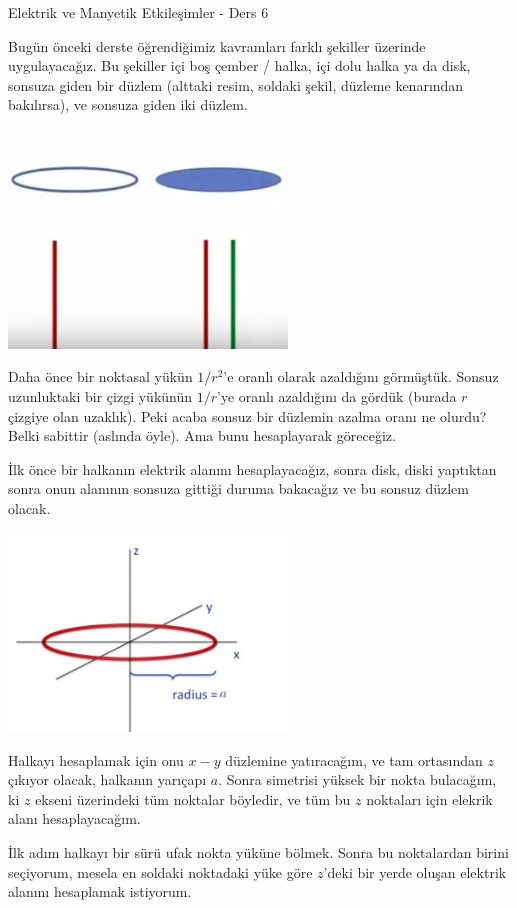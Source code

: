 \documentclass[12pt,fleqn]{article}\usepackage{../../common}
\begin{document}
Elektrik ve Manyetik Etkileşimler - Ders 6

Bugün önceki derste öğrendiğimiz kavramları farklı şekiller üzerinde
uygulayacağız. Bu şekiller içi boş çember / halka, içi dolu halka ya da
disk, sonsuza giden bir düzlem (alttaki resim, soldaki şekil, düzleme
kenarından bakılırsa), ve sonsuza giden iki düzlem.

\includegraphics[width=20em]{06_01.png}

Daha önce bir noktasal yükün $1/r^2$'e oranlı olarak azaldığını
görmüştük. Sonsuz uzunluktaki bir çizgi yükünün $1/r$'ye oranlı azaldığını da
gördük (burada $r$ çizgiye olan uzaklık). Peki acaba sonsuz bir düzlemin azalma
oranı ne olurdu? Belki sabittir (aslında öyle). Ama bunu hesaplayarak göreceğiz.

İlk önce bir halkanın elektrik alanını hesaplayacağız, sonra disk, diski
yaptıktan sonra onun alanının sonsuza gittiği duruma bakacağız ve bu sonsuz
düzlem olacak.

\includegraphics[width=20em]{06_02.jpg}

Halkayı hesaplamak için onu $x-y$ düzlemine yatıracağım, ve tam ortasından $z$
çıkıyor olacak, halkanın yarıçapı $a$. Sonra simetrisi yüksek bir nokta
bulacağım, ki $z$ ekseni üzerindeki tüm noktalar böyledir, ve tüm bu $z$
noktaları için elekrik alanı hesaplayacağım.

İlk adım halkayı bir sürü ufak nokta yüküne bölmek. Sonra bu noktalardan birini
seçiyorum, mesela en soldaki noktadaki yüke göre $z$'deki bir yerde oluşan
elektrik alanını hesaplamak istiyorum.
\end{document}

